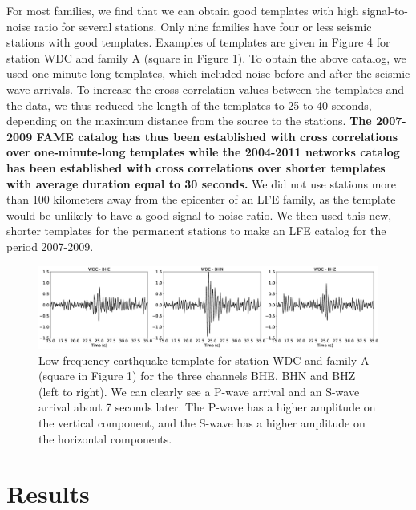 \documentclass[draft]{agujournal2019}
\begin{document}
For most families, we find that we can obtain good templates with high signal-to-noise ratio for several stations. Only nine families have four or less seismic stations with good templates. Examples of templates are given in Figure 4 for station WDC and family A (square in Figure 1). To obtain the above catalog, we used one-minute-long templates, which included noise before and after the seismic wave arrivals. To increase the cross-correlation values between the templates and the data, we thus reduced the length of the templates to 25 to 40 seconds, depending on the maximum distance from the source to the stations. \textbf{The 2007-2009 FAME catalog has thus been established with cross correlations over one-minute-long templates while the 2004-2011 networks catalog has been established with cross correlations over shorter templates with average duration equal to 30 seconds.} We did not use stations more than 100 kilometers away from the epicenter of an LFE family, as the template would be unlikely to have a good signal-to-noise ratio. We then used this new, shorter templates for the permanent stations to make an LFE catalog for the period 2007-2009. \\

\begin{figure}
\noindent\includegraphics[width=\textwidth, trim={0cm 0cm 0cm 0cm},clip]{figures/templates.eps}
\caption{Low-frequency earthquake template for station WDC and family A (square in Figure 1) for the three channels BHE, BHN and BHZ (left to right). We can clearly see a P-wave arrival and an S-wave arrival about 7 seconds later. The P-wave has a higher amplitude on the vertical component, and the S-wave has a higher amplitude on the horizontal components.}
\label{pngfiguresample}
\end{figure}

\section{Results}
\end{document}
